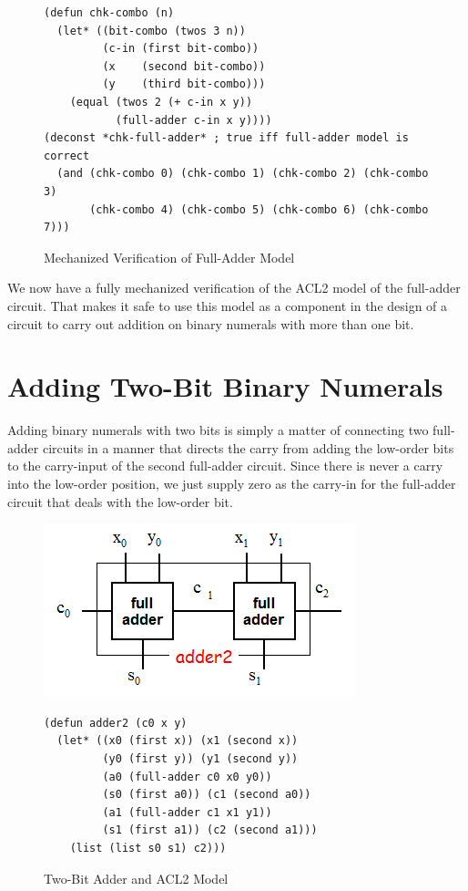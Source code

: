 \begin{figure}
\begin{center}
\begin{lstlisting}
(defun chk-combo (n)
  (let* ((bit-combo (twos 3 n))
         (c-in (first bit-combo))
         (x    (second bit-combo))
         (y    (third bit-combo)))
    (equal (twos 2 (+ c-in x y))
           (full-adder c-in x y))))
(deconst *chk-full-adder* ; true iff full-adder model is correct
  (and (chk-combo 0) (chk-combo 1) (chk-combo 2) (chk-combo 3)
       (chk-combo 4) (chk-combo 5) (chk-combo 6) (chk-combo 7)))
\end{lstlisting}
\end{center}
\caption{Mechanized Verification of Full-Adder Model}
\label{fig:full-adder-model-check}
\end{figure}

We now have a fully mechanized verification
of the ACL2 model of the full-adder circuit.
That makes it safe to use this model as a component
in the design of a circuit to carry out addition on binary numerals
with more than one bit.

\section{Adding Two-Bit Binary Numerals}
\label{sec:adding-2-bit-numerals}

Adding binary numerals with two bits is simply a matter
of connecting two full-adder circuits in a manner that
directs the carry from adding the low-order bits
to the carry-input of the second full-adder circuit.
Since there is never a carry into the low-order position,
we just supply zero as the carry-in for the full-adder circuit
that deals with the low-order bit.

\begin{figure}
\begin{center}
\includegraphics[scale=0.9]{Images/adder2.png}
\begin{lstlisting}
(defun adder2 (c0 x y)
  (let* ((x0 (first x)) (x1 (second x))
         (y0 (first y)) (y1 (second y))
         (a0 (full-adder c0 x0 y0))
         (s0 (first a0)) (c1 (second a0))
         (a1 (full-adder c1 x1 y1))
         (s1 (first a1)) (c2 (second a1)))
    (list (list s0 s1) c2)))
\end{lstlisting}
\end{center}
\caption{Two-Bit Adder and ACL2 Model}
\label{fig:adder2}
\end{figure}

